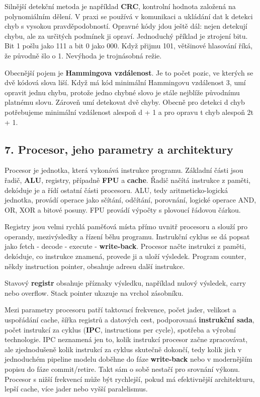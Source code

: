 Silnější detekční metoda je například \textbf{CRC}, kontrolní hodnota založená na polynomiálním dělení. V praxi se používá v komunikaci a ukládání dat k detekci chyb s vysokou pravděpodobností. Opravné kódy jdou ještě dál: nejen detekují chybu, ale za určitých podmínek ji opraví. Jednoduchý příklad je ztrojení bitu. Bit 1 pošlu jako 111 a bit 0 jako 000. Když přijmu 101, většinové hlasování říká, že původně šlo o 1. Nevýhoda je trojnásobná režie.

Obecnější pojem je \textbf{Hammingova vzdálenost}. Je to počet pozic, ve kterých se dvě kódová slova liší. Když má kód minimální Hammingovu vzdálenost 3, umí opravit jednu chybu, protože jedno chybné slovo je stále nejblíže původnímu platnému slovu. Zároveň umí detekovat dvě chyby. Obecně pro detekci d chyb potřebujeme minimální vzdálenost alespoň d + 1 a pro opravu t chyb alespoň 2t + 1.

\subsection*{7. Procesor, jeho parametry a architektury}

Procesor je jednotka, která vykonává instrukce programu. Základní části jsou řadič, \textbf{ALU}, registry, případně \textbf{FPU} a \textbf{cache}. Řadič načítá instrukce z paměti, dekóduje je a řídí ostatní části procesoru. ALU, tedy aritmeticko-logická jednotka, provádí operace jako sčítání, odčítání, porovnání, logické operace AND, OR, XOR a bitové posuny. FPU provádí výpočty s plovoucí řádovou čárkou.

Registry jsou velmi rychlá paměťová místa přímo uvnitř procesoru a slouží pro operandy, mezivýsledky a řízení běhu programu. Instrukční cyklus se dá popsat jako fetch - decode - execute - \textbf{write-back}. Procesor načte instrukci z paměti, dekóduje, co instrukce znamená, provede ji a uloží výsledek. Program counter, někdy instruction pointer, obsahuje adresu další instrukce.

Stavový \textbf{registr} obsahuje příznaky výsledku, například nulový výsledek, carry nebo overflow. Stack pointer ukazuje na vrchol zásobníku.

Mezi parametry procesoru patří taktovací frekvence, počet jader, velikost a uspořádání cache, šířka registrů a datových cest, podporovaná \textbf{instrukční sada}, počet instrukcí za cyklus (\textbf{IPC}, instructions per cycle), spotřeba a výrobní technologie. IPC neznamená jen to, kolik instrukcí procesor začne zpracovávat, ale zjednodušeně kolik instrukcí za cyklus skutečně dokončí, tedy kolik jich v jednoduchém pipeline modelu doběhne do fáze \textbf{write-back} nebo v modernějším popisu do fáze commit/retire. Takt sám o sobě nestačí pro srovnání výkonu. Procesor s nižší frekvencí může být rychlejší, pokud má efektivnější architekturu, lepší cache, více jader nebo vyšší paralelismus.

